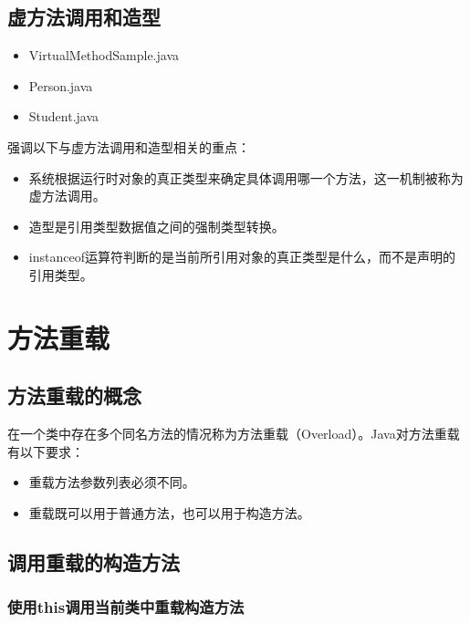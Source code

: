 \subsection{虚方法调用和造型}


\begin{itemize}\small
\item VirtualMethodSample.java
\item Person.java
\item Student.java
\end{itemize}
  
强调以下与虚方法调用和造型相关的重点：
  
\begin{itemize}
\item 系统根据运行时对象的真正类型来确定具体调用哪一个方法，这一机制被称为
  {\hei\Blue 虚方法调用}。
\item 造型是引用类型数据值之间的强制类型转换。
\item instanceof运算符判断的是当前所引用对象的真正类型是什么，而不是声明的引用类型。
\end{itemize}

\section{方法重载}

\subsection{方法重载的概念}

在一个类中存在多个同名方法的情况称为{\hei 方法重载（Overload）}。Java对方法重载有以下要求：

\begin{itemize}
\item 重载方法参数列表必须不同。
\item 重载既可以用于普通方法，也可以用于构造方法。
\end{itemize}



\subsection{调用重载的构造方法}
  
\subsubsection{使用this调用当前类中重载构造方法}

